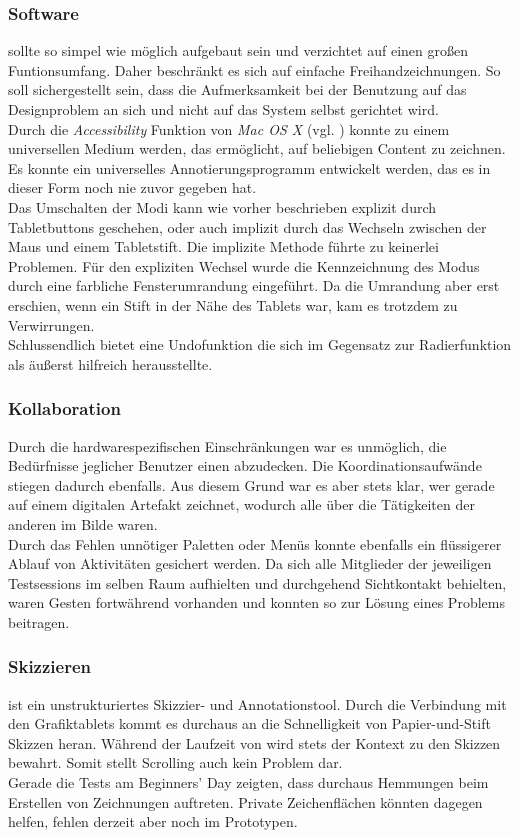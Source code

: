 \subsubsection*{Software}
\scribbler sollte so simpel wie möglich aufgebaut sein und verzichtet auf einen großen Funtionsumfang. Daher beschränkt es sich auf einfache Freihandzeichnungen. So soll sichergestellt sein, dass die Aufmerksamkeit bei der Benutzung auf das Designproblem an sich und nicht auf das System selbst gerichtet wird. \\
Durch die \emph{Accessibility} Funktion von \emph{Mac OS X} (vgl. ) konnte \scribbler zu einem universellen Medium werden, das ermöglicht, auf beliebigen Content zu zeichnen. Es konnte ein universelles Annotierungsprogramm entwickelt werden, das es in dieser Form noch nie zuvor gegeben hat. \\ 
Das Umschalten der Modi kann wie vorher beschrieben explizit durch Tabletbuttons geschehen, oder auch implizit durch das Wechseln zwischen der Maus und einem Tabletstift. Die implizite Methode führte zu keinerlei Problemen. Für den expliziten Wechsel wurde die Kennzeichnung des Modus durch eine farbliche Fensterumrandung eingeführt. Da die Umrandung aber erst erschien, wenn ein Stift in der Nähe des Tablets war, kam es trotzdem zu Verwirrungen. \\

Schlussendlich bietet \scribbler eine Undofunktion die sich im Gegensatz zur Radierfunktion als äußerst hilfreich herausstellte.

\subsubsection*{Kollaboration} 
Durch die hardwarespezifischen Einschränkungen war es unmöglich, die Bedürfnisse jeglicher Benutzer einen abzudecken. Die Koordinationsaufwände stiegen dadurch ebenfalls. Aus diesem Grund war es aber stets klar, wer gerade auf einem digitalen Artefakt zeichnet, wodurch alle über die Tätigkeiten der anderen im Bilde waren.\\
Durch das Fehlen unnötiger Paletten oder Menüs konnte ebenfalls ein flüssigerer Ablauf von Aktivitäten gesichert werden. Da sich alle Mitglieder der jeweiligen Testsessions im selben Raum aufhielten und durchgehend Sichtkontakt behielten, waren Gesten fortwährend vorhanden und konnten so zur Lösung eines Problems beitragen.

\subsubsection*{Skizzieren} 
\scribbler ist ein unstrukturiertes Skizzier- und Annotationstool. Durch die Verbindung mit den Grafiktablets kommt es durchaus an die Schnelligkeit von Papier-und-Stift Skizzen heran. Während der Laufzeit von \scribbler wird stets der Kontext zu den Skizzen bewahrt. Somit stellt Scrolling auch kein Problem dar. \\
Gerade die Tests am Beginners' Day zeigten, dass durchaus Hemmungen beim Erstellen von Zeichnungen auftreten. Private Zeichenflächen könnten dagegen helfen, fehlen derzeit aber noch im Prototypen.

